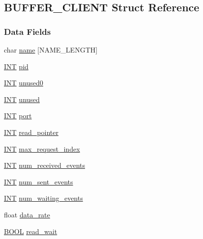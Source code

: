 \subsection{BUFFER\_\-CLIENT Struct Reference}
\label{structBUFFER__CLIENT}
\subsubsection*{Data Fields}
\begin{DoxyCompactItemize}
\item 
char \hyperlink{structBUFFER__CLIENT_aa626137fa4097c5a254a31d4f953a47f}{name} \mbox{[}NAME\_\-LENGTH\mbox{]}
\item 
\hyperlink{vppg_8h_a392e62da233ed3e2f7c3fd4f487a3896}{INT} \hyperlink{structBUFFER__CLIENT_a44911884d209e2a4f90fb02033d8cb94}{pid}
\item 
\hyperlink{vppg_8h_a392e62da233ed3e2f7c3fd4f487a3896}{INT} \hyperlink{structBUFFER__CLIENT_a0368d60206a1130f3ed93b9b84934738}{unused0}
\item 
\hyperlink{vppg_8h_a392e62da233ed3e2f7c3fd4f487a3896}{INT} \hyperlink{structBUFFER__CLIENT_a1dfdc586ff9586685c8f3c57382e1e4d}{unused}
\item 
\hyperlink{vppg_8h_a392e62da233ed3e2f7c3fd4f487a3896}{INT} \hyperlink{structBUFFER__CLIENT_ad8112ed9dd177230ff2a9acfd84c5429}{port}
\item 
\hyperlink{vppg_8h_a392e62da233ed3e2f7c3fd4f487a3896}{INT} \hyperlink{structBUFFER__CLIENT_ae0c5c3a62b9dac568d8f45cf4bc951ab}{read\_\-pointer}
\item 
\hyperlink{vppg_8h_a392e62da233ed3e2f7c3fd4f487a3896}{INT} \hyperlink{structBUFFER__CLIENT_ac7c61ec3f675c1a196751ec73baabb43}{max\_\-request\_\-index}
\item 
\hyperlink{vppg_8h_a392e62da233ed3e2f7c3fd4f487a3896}{INT} \hyperlink{structBUFFER__CLIENT_ae39c03ec4a903372ec71538032204556}{num\_\-received\_\-events}
\item 
\hyperlink{vppg_8h_a392e62da233ed3e2f7c3fd4f487a3896}{INT} \hyperlink{structBUFFER__CLIENT_a035eae26fbcb45b445c5efde3acfacf7}{num\_\-sent\_\-events}
\item 
\hyperlink{vppg_8h_a392e62da233ed3e2f7c3fd4f487a3896}{INT} \hyperlink{structBUFFER__CLIENT_ae4c382bab7844d80089d2e6e0f1a83ce}{num\_\-waiting\_\-events}
\item 
float \hyperlink{structBUFFER__CLIENT_aab8057a2018cd46205253446a4e7cd3a}{data\_\-rate}
\item 
\hyperlink{vt2_8h_a239c7f0d40651c3e419c5b9651507d14}{BOOL} \hyperlink{structBUFFER__CLIENT_a896acd334d608006626fcca2a872a4a4}{read\_\-wait}

\end{DoxyCompactItemize}
